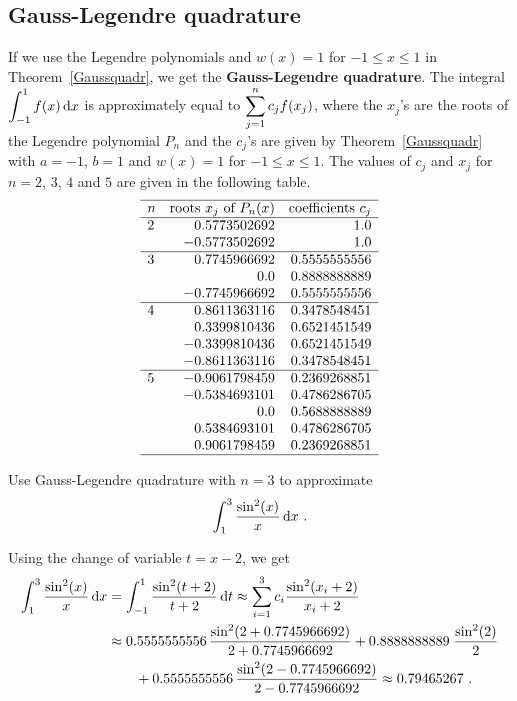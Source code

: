 \subsection{Gauss-Legendre quadrature}

If we use the Legendre polynomials and $w(x) = 1$ for $-1\leq x\leq 1$
in Theorem~\ref{Gaussquadr}, we get the
{\bfseries Gauss-Legendre quadrature}.  The integral 
$\displaystyle \int_{-1}^1 f(x) \,\mathrm{d}x$ is approximately equal to
$\displaystyle \sum_{j=1}^n c_j f(x_j)$, where the $x_j$'s are the
roots of the Legendre polynomial $P_n$ and the $c_j$'s are given by
Theorem~\ref{Gaussquadr} with $a=-1$, $b=1$ and $w(x) = 1$ for
$-1\leq x\leq1$.  The values of $c_j$ and $x_j$ for $n=2$, $3$, $4$
and $5$ are given in the following table.
\[
\begin{array}{lrr}
\hline
n & \text{roots $x_j$ of $P_n(x)$} & \text{coefficients $c_j$} \\
\hline
2 & 0.5773502692 & 1.0 \\
  & -0.5773502692 & 1.0 \\
\hline
3 & 0.7745966692 & 0.5555555556 \\
  & 0.0 & 0.8888888889 \\
  & -0.7745966692 & 0.5555555556 \\
\hline
4 & 0.8611363116 & 0.3478548451 \\
  & 0.3399810436 & 0.6521451549 \\
  & -0.3399810436 & 0.6521451549 \\
  & -0.8611363116 & 0.3478548451 \\
\hline
5 & -0.9061798459 & 0.2369268851 \\
  & -0.5384693101 & 0.4786286705 \\
  & 0.0 & 0.5688888889 \\
  & 0.5384693101 & 0.4786286705 \\
  & 0.9061798459 & 0.2369268851 \\
\hline
\end{array}
\]

\begin{egg}
Use Gauss-Legendre quadrature with $n=3$ to approximate
\[
\int_1^3 \frac{\sin^2(x)}{x}\,\mathrm{d}x\ .
\]

Using the change of variable $t = x - 2$, we get
\begin{align*}
\int_1^3 \frac{\sin^2(x)}{x}\,\mathrm{d}x &=
\int_{-1}^1 \frac{\sin^2(t+2)}{t+2}\,\mathrm{d}t
\approx \sum_{i=1}^3 c_i \frac{\sin^2(x_i+2)}{x_i+2} \\
&\approx 0.5555555556 \,\frac{\sin^2(2+0.7745966692)}{2+0.7745966692} +
0.8888888889\; \frac{\sin^2(2)}{2} \\
& \qquad + 0.5555555556 \,\frac{\sin^2(2-0.7745966692)}{2-0.7745966692}
\approx 0.79465267 \ .
\end{align*}
\end{egg}

